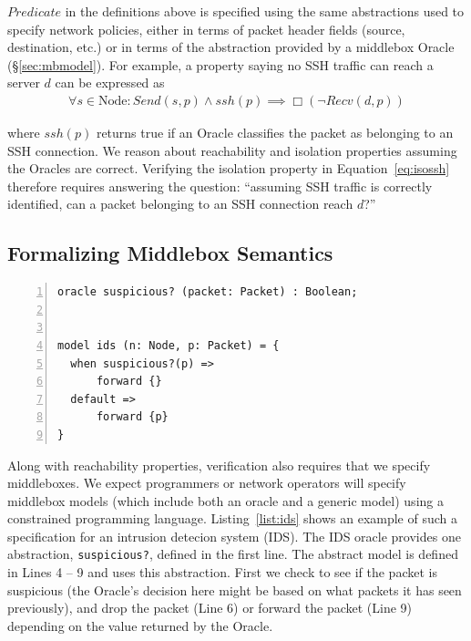 $Predicate$ in the definitions above is specified using the same abstractions used to specify network policies, \ie either in terms of packet
header fields (source, destination, etc.) or in terms of the abstraction provided by a middlebox Oracle (\S\ref{sec:mbmodel}). For example, a property 
saying no SSH traffic can reach a server $d$ can be expressed as
\begin{align}
\forall s\in \text{Node}: Send(s, p) \land ssh(p) \implies \Box(\neg Recv(d, p)) \label{eq:isossh}
\end{align}

where $ssh(p)$ returns true if an Oracle classifies the packet as belonging to an SSH connection.
We reason about reachability and isolation properties assuming the Oracles are correct.
Verifying the isolation property in Equation~\ref{eq:isossh} therefore requires answering the question:
``assuming SSH traffic is correctly identified, can a packet belonging to an SSH connection reach $d$?''

\subsection{Formalizing Middlebox Semantics}
\begin{lstlisting}[caption={Model for an IDS},label=list:ids,captionpos=t,float,abovecaptionskip=-\medskipamount,
                    numbers=left,
                    morekeywords={oracle, model, when, default, state, forward}]
oracle suspicious? (packet: Packet) : Boolean;


model ids (n: Node, p: Packet) = {
  when suspicious?(p) =>
      forward {}
  default =>
      forward {p}
}
\end{lstlisting}

Along with reachability properties, verification also requires that we specify middleboxes. We expect programmers or network operators will specify middlebox
models (which include both an oracle and a generic model) using a constrained programming language. Listing~\ref{list:ids} shows an example of such a specification
for an intrusion detecion system (IDS). The IDS oracle provides one abstraction, \texttt{suspicious?}, defined in the first line. The abstract model is
defined in Lines 4 -- 9 and uses this abstraction. First we check to see if the packet is suspicious (the Oracle's decision here might be based on what
packets it has seen previously), and  drop the packet (Line 6) or forward the packet (Line 9) depending on the value returned by the Oracle.  

